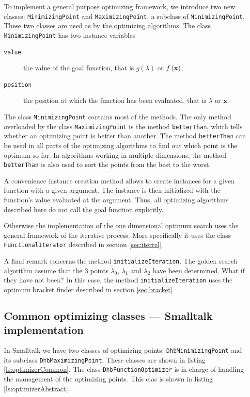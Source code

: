 \documentclass[twoside]{book}
\begin{document}
To implement a general purpose optimizing framework, we introduce
two new classes: {\tt MinimizingPoint} and {\tt MaximizingPoint},
 a subclass of {\tt MinimizingPoint}. These two classes
are used as  by the optimizing algorithms. The
class {\tt MinimizingPoint} has two instance variables
\begin{description}
  \item[\tt value] the value of the goal function, that is
  $g\left(\lambda\right)$ or $f\left({\bf x}\right)$;
  \item[\tt position] the position at which the function has been
  evaluated, that is $\lambda$ or ${\bf x}$.
\end{description}
The class {\tt MinimizingPoint} contains most of the methods. The
only method overloaded by the class  {\tt MaximizingPoint} is the
method {\tt betterThan}, which tells whether an optimizing point
is better than another. The method {\tt betterThan} can be used in
all parts of the optimizing algorithms to find out which point is
the optimum so far. In algorithms working in multiple dimensions,
the method {\tt betterThan} is also used to sort the points from
the best to the worst.

A convenience instance creation method allows to create instances
for a given function with a given argument. The instance is then
initialized with the function's value evaluated at the argument.
Thus, all optimizing algorithms described here do not call the
goal function explicitly.

Otherwise the implementation of the one dimensional optimum search
uses the general framework of the iterative process. More
specifically it uses the class {\tt FunctionalIterator} described
in section \ref{sec:iterrel}.

A final remark concerns the method {\tt initializeIteration}. The
golden search algorithm assume that the 3 points $\lambda_0$,
$\lambda_1$ and $\lambda_2$ have been determined. What if they
have not been? In this case, the method {\tt initializeIteration}
uses the optimum bracket finder described in section
\ref{sec:bracket}

\subsection{Common optimizing classes --- Smalltalk implementation}
\label{sec:sgeneralOpt}  In Smalltalk we have two classes
of optimizing points: {\tt DhbMinimizingPoint} and its subclass
{\tt DhbMaximizingPoint}. These classes are shown in listing
\ref{ls:optimizerCommon}. The class {\tt DhbFunctionOptimizer} is
in charge of handling the management of the optimizing points.
This clas is shown in listing \ref{ls:optimizerAbstract}.
\end{document}
